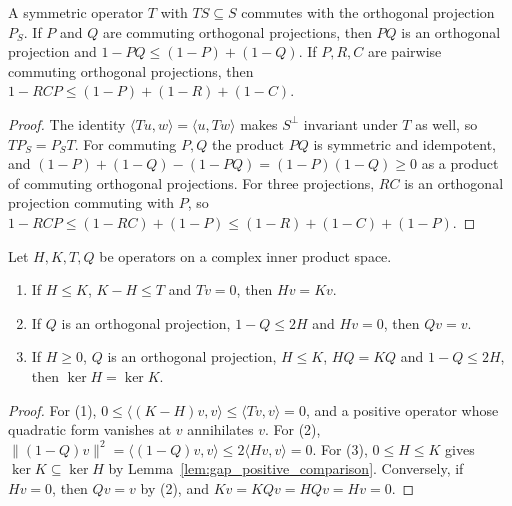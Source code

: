 \begin{lemma}
    \label{lem:gap_commuting_projections}
    \leanok
    A symmetric operator $T$ with $TS\subseteq S$ commutes with the orthogonal
    projection $P_S$. If $P$ and $Q$ are commuting orthogonal projections, then $PQ$
    is an orthogonal projection and $1-PQ\le(1-P)+(1-Q)$. If $P,R,C$ are pairwise
    commuting orthogonal projections, then $1-RCP\le(1-P)+(1-R)+(1-C)$.
\end{lemma}
\begin{proof}\leanok
    The identity $\langle Tu,w\rangle=\langle u,Tw\rangle$ makes $S^\perp$ invariant
    under $T$ as well, so $TP_S=P_ST$. For commuting $P,Q$ the product $PQ$ is
    symmetric and idempotent, and
    $(1-P)+(1-Q)-(1-PQ)=(1-P)(1-Q)\ge0$ as a product of commuting orthogonal
    projections. For three projections, $RC$ is an orthogonal projection commuting
    with $P$, so $1-RCP\le(1-RC)+(1-P)\le(1-R)+(1-C)+(1-P)$.
\end{proof}

\begin{lemma}
    \label{lem:gap_reducing_projection_kernel}
    \leanok
    Let $H,K,T,Q$ be operators on a complex inner product space.
    \begin{enumerate}
        \item If $H\le K$, $K-H\le T$ and $Tv=0$, then $Hv=Kv$.
        \item If $Q$ is an orthogonal projection, $1-Q\le2H$ and $Hv=0$, then $Qv=v$.
        \item If $H\ge0$, $Q$ is an orthogonal projection, $H\le K$, $HQ=KQ$ and
              $1-Q\le2H$, then $\ker H=\ker K$.
    \end{enumerate}
\end{lemma}
\begin{proof}\leanok
    For (1), $0\le\langle(K-H)v,v\rangle\le\langle Tv,v\rangle=0$, and a positive
    operator whose quadratic form vanishes at $v$ annihilates $v$. For (2),
    $\lVert(1-Q)v\rVert^2=\langle(1-Q)v,v\rangle\le2\langle Hv,v\rangle=0$. For (3),
    $0\le H\le K$ gives $\ker K\subseteq\ker H$ by
    Lemma~\ref{lem:gap_positive_comparison}. Conversely, if $Hv=0$, then $Qv=v$ by
    (2), and $Kv=KQv=HQv=Hv=0$.
\end{proof}

